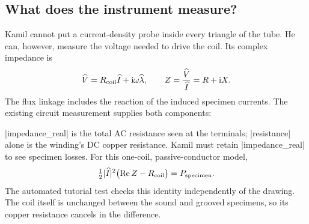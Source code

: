 \begin{codeexample}[width=0pt]
\end{codeexample}


\subsection{What does the instrument measure?}
Kamil cannot put a current-density probe inside every triangle of the tube.
He can, however, measure the voltage needed to drive the coil. Its complex
impedance is
\[
 \widehat V=R_{\rm coil}\widehat I+\mathrm i\omega\widehat\lambda,
 \qquad Z=\frac{\widehat V}{\widehat I}=R+\mathrm iX.
\]
The flux linkage includes the reaction of the induced specimen currents.
The existing circuit measurement supplies both components:
\begin{codeexample}
\femmmeasure[name=probe-reading,quantity=circuit,circuit=probe]
\end{codeexample}
|impedance_real| is the total AC resistance seen at the terminals;
|resistance| alone is the winding's DC copper resistance. Kamil must retain
|impedance_real| to see specimen losses. For this one-coil, passive-conductor
model,
\[
 \tfrac12|\widehat I|^2\bigl(\mathop{\rm Re}Z-R_{\rm coil}\bigr)
 =P_{\rm specimen}.
\]
The automated tutorial test checks this identity independently of the drawing.
The coil itself is unchanged between the sound and grooved specimens, so
its copper resistance cancels in the difference.

